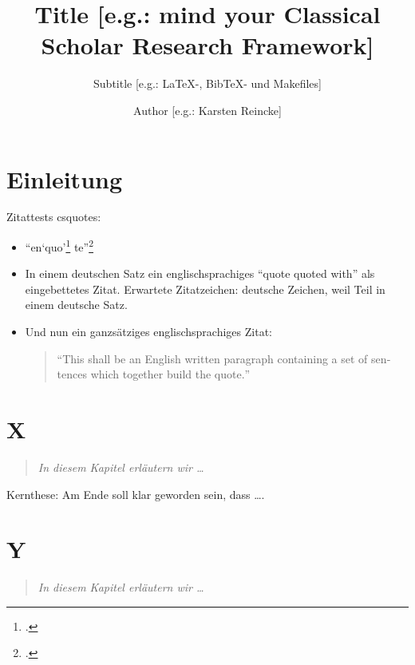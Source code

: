 \documentclass[DIV=calc,BCOR=5mm,11pt,headings=small,oneside,abstract=true,toc=bib]{scrbook}
\begin{document}
\nocite{*}

\titlehead{Z.B.Geisteswissenschftliche Forschungsarbeit}
\subject{Topic [e.g.: myCsrf-]}
\title{Title [e.g.: mind your Classical Scholar Research Framework]}
\subtitle{Subtitle [e.g.: LaTeX-, BibTeX- und Makefiles]}
\author{Author [e.g.: Karsten Reincke]}
\maketitle

\footnotesize
\tableofcontents

\normalsize
\chapter{Einleitung}
Zitattests csquotes: 

\begin{itemize}
  \item \enquote{en\enquote{quo}\footcite[vgl.][15]{AllHen2008a}
te}\footcite[vgl.][15]{AllHen2008a}

  \item In einem deutschen Satz ein englischsprachiges
  \foreignquote{english}{quote quoted with} als eingebettetes Zitat. Erwartete
  Zitatzeichen: deutsche Zeichen, weil Teil in einem deutsche Satz.
  
  \item Und nun ein ganzsätziges englischsprachiges Zitat:
  \begin{quote}
    \foreignquote{english}{This shall be an English written paragraph containing
    a set of sentences which together build the quote.}
  \end{quote}
  
\end{itemize}

\chapter{X}
\begin{quote}\itshape
In diesem Kapitel erläutern wir \ldots
\end{quote} 

Kernthese: Am Ende soll klar geworden sein, dass \ldots.

\chapter{Y}
\begin{quote}\itshape
In diesem Kapitel erläutern wir \ldots
\end{quote} 
\end{document}
